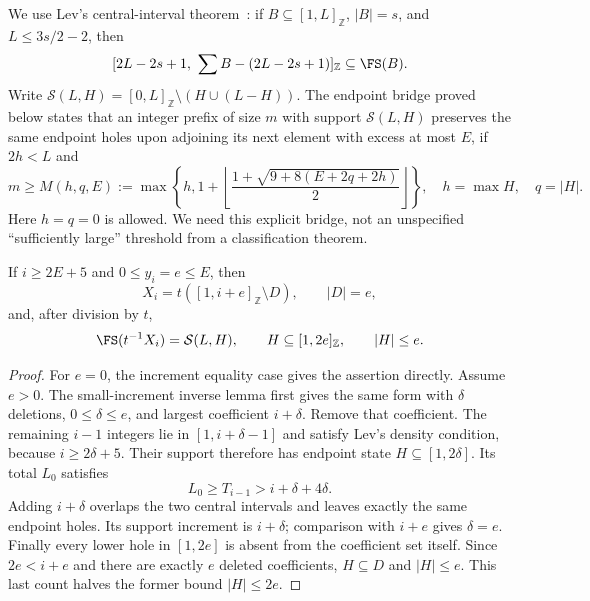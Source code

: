 We use Lev's central-interval theorem~\cite{Lev1998}: if
$B\subseteq[1,L]_{\mathbb Z}$, $|B|=s$, and $L\leq3s/2-2$, then
\[
[2L-2s+1,\ \sum B-(2L-2s+1)]_{\mathbb Z}\subseteq\FS(B).
\]
Write $\mathcal S(L,H)=[0,L]_{\mathbb Z}\setminus(H\cup(L-H))$.
The endpoint bridge proved below states that an
integer prefix of size $m$ with support $\mathcal S(L,H)$ preserves the same
endpoint holes upon adjoining its next element with excess at most $E$, if
$2h<L$ and
\[
m\geq M(h,q,E):=
\max\left\{h,1+\left\lfloor
\frac{1+\sqrt{9+8(E+2q+2h)}}2\right\rfloor\right\},
\quad h=\max H,\quad q=|H|.
\]
Here $h=q=0$ is allowed. We need this explicit bridge, not an unspecified
``sufficiently large'' threshold from a classification theorem.

\begin{lemma}\label{lem:counted-holes}
If $i\geq2E+5$ and $0\leq y_i=e\leq E$, then
\[
X_i=t([1,i+e]_{\mathbb Z}\setminus D),\qquad |D|=e,
\]
and, after division by $t$,
\[
\FS(t^{-1}X_i)=\mathcal S(L,H),\qquad
H\subseteq[1,2e]_{\mathbb Z},\qquad |H|\leq e.
\]
\end{lemma}
\begin{proof}
For $e=0$, the increment equality case gives the assertion directly.
Assume $e>0$. The small-increment inverse lemma first gives the same form with $\delta$
deletions, $0\leq\delta\leq e$, and largest coefficient $i+\delta$.
Remove that coefficient. The remaining $i-1$ integers lie in
$[1,i+\delta-1]$ and satisfy Lev's density condition, because
$i\geq2\delta+5$. Their support therefore has endpoint state
$H\subseteq[1,2\delta]$. Its total $L_0$ satisfies
\[
L_0\geq T_{i-1}>i+\delta+4\delta.
\]
Adding $i+\delta$ overlaps the two central intervals and leaves exactly
the same endpoint holes. Its support increment is $i+\delta$; comparison
with $i+e$ gives $\delta=e$.
Finally every lower hole in $[1,2e]$ is absent from the coefficient set
itself. Since $2e<i+e$ and there are exactly $e$ deleted coefficients,
$H\subseteq D$ and $|H|\leq e$. This last count halves the former bound
$|H|\leq2e$.
\end{proof}

